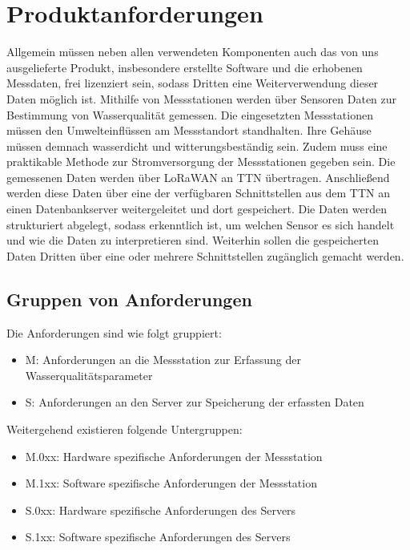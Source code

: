 \section{Produktanforderungen}

Allgemein müssen neben allen verwendeten Komponenten auch das von uns ausgelieferte
Produkt, insbesondere erstellte Software und die erhobenen Messdaten, frei lizenziert
sein, sodass Dritten eine Weiterverwendung dieser Daten möglich ist.\newline
Mithilfe von Messstationen werden über Sensoren Daten zur Bestimmung von Wasserqualität
gemessen. Die eingesetzten Messstationen müssen den Umwelteinflüssen am Messstandort
standhalten. Ihre Gehäuse müssen demnach wasserdicht und witterungsbest\"andig sein. Zudem muss
eine praktikable Methode zur Stromversorgung der Messstationen gegeben sein.\newline
Die gemessenen Daten werden über LoRaWAN an TTN übertragen. Anschließend werden diese
Daten über eine der verfügbaren Schnittstellen aus dem TTN an einen Datenbankserver
weitergeleitet und dort gespeichert. Die Daten werden strukturiert abgelegt,
sodass erkenntlich ist, um welchen Sensor es sich handelt und wie die Daten zu
interpretieren sind. Weiterhin sollen die gespeicherten Daten Dritten über
eine oder mehrere Schnittstellen zugänglich gemacht werden.

\subsection{Gruppen von Anforderungen}

Die Anforderungen sind wie folgt gruppiert:
\begin{itemize}
	\item M: Anforderungen an die Messstation zur Erfassung der Wasserqualitätsparameter
	\item S: Anforderungen an den Server zur Speicherung der erfassten Daten
\end{itemize}

Weitergehend existieren folgende Untergruppen:
\begin{itemize}
	\item M.0xx: Hardware spezifische Anforderungen der Messstation
	\item M.1xx: Software spezifische Anforderungen der Messstation
	\item S.0xx: Hardware spezifische Anforderungen des Servers
	\item S.1xx: Software spezifische Anforderungen des Servers
\end{itemize}

